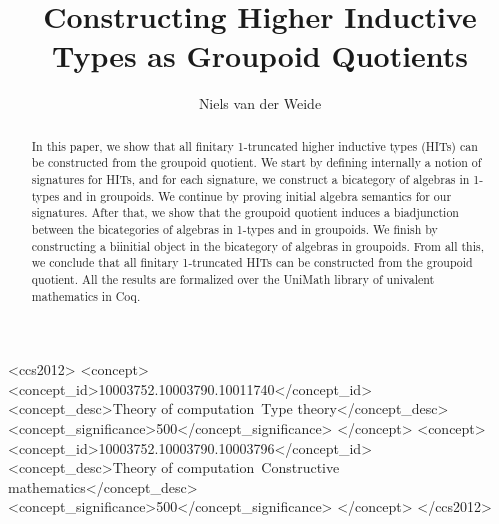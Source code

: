\documentclass[sigplan,screen]{acmart}
\theoremstyle{plain}
\theoremstyle{definition}
\begin{document}
	
\lstset{language=Coq}

\title{Constructing Higher Inductive Types as Groupoid Quotients}


\author{Niels van der Weide}

\begin{abstract}
	In this paper, we show that all finitary 1-truncated higher inductive types (HITs) can be constructed from the groupoid quotient.
	We start by defining internally a notion of signatures for HITs,
	and for each signature, we construct a bicategory of algebras in 1-types and in groupoids.
	We continue by proving initial algebra semantics for our signatures.
	After that, we show that the groupoid quotient induces a biadjunction between the bicategories of algebras in 1-types and in groupoids.
	We finish by constructing a biinitial object in the bicategory of algebras in groupoids.
	From all this, we conclude that all finitary 1-truncated HITs can be constructed from the groupoid quotient. 
	All the results are formalized over the UniMath library of univalent mathematics in Coq.
\end{abstract}

\begin{CCSXML}
	<ccs2012>
	<concept>
	<concept_id>10003752.10003790.10011740</concept_id>
	<concept_desc>Theory of computation~Type theory</concept_desc>
	<concept_significance>500</concept_significance>
	</concept>
	<concept>
	<concept_id>10003752.10003790.10003796</concept_id>
	<concept_desc>Theory of computation~Constructive mathematics</concept_desc>
	<concept_significance>500</concept_significance>
	</concept>
	</ccs2012>
\end{CCSXML}
\end{document}
